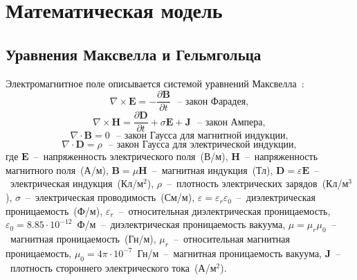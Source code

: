 \documentclass[a4paper,14pt]{article}
\makeatletter
\newcommand{\labelname}[1]{%
	\def\@currentlabelname{#1}}%
\makeatother
\begin{document}

\clearpage
\section{Математическая модель}
\labelname{1}\label{sec:math_model}
\subsection{Уравнения Максвелла и Гельмгольца}
Электромагнитное поле описывается системой уравнений Максвелла~\citep{epov}:
\begin{equation}
	\nabla \times \mathbf{E} = - \frac{ \partial \mathbf{B} }{ \partial t } \text{~~--~закон Фарадея}, \label{eq:maxwell:faradey}
\end{equation}
\begin{equation}
	\nabla \times \mathbf{H} = \frac{ \partial \mathbf{D} }{ \partial t } + \sigma \mathbf{E} + \mathbf{J} \text{~~--~закон Ампера}, \label{eq:maxwell:amper}
\end{equation}
\begin{equation*}
	\nabla \cdot \mathbf{B} = 0 \text{~~--~закон Гаусса для магнитной индукции}, \label{eq:maxwell:gauss_magn}
\end{equation*}
\begin{equation*}
	\nabla \cdot \mathbf{D} = \rho \text{~~--~закон Гаусса для электрической индукции}, \label{eq:maxwell:gauss_elect}
\end{equation*}
где $\mathbf{E}$~--~напряженность электрического поля~(В/м), $\mathbf{H}$~--~напряженность магнитного поля~(А/м), $\mathbf{B}=\mu \mathbf{H}$~--~магнитная индукция~(Тл), $\mathbf{D}=\varepsilon \mathbf{E}$~--~электрическая индукция~(Кл/м${}^2$), $\rho$~--~плотность электрических зарядов~(Кл/м${}^3$), $\sigma$~--~электрическая проводимость~(См/м), $\varepsilon = \varepsilon_r \varepsilon_0$~--~диэлектрическая проницаемость~(Ф/м), $\varepsilon_r$~--~относительная диэлектрическая проницаемость, $\varepsilon_0 = 8.85 \cdot 10^{-12}$~Ф/м~--~диэлектрическая проницаемость вакуума, $\mu = \mu_r \mu_0$~--~магнитная проницаемость~(Гн/м), $\mu_r$~--~относительная магнитная проницаемость, $\mu_0 = 4 \pi \cdot 10^{-7}$~Гн/м~--~магнитная проницаемость вакуума, $\mathbf{J}$~--~плотность стороннего электрического тока~(А/м${}^2$).
\end{document}
